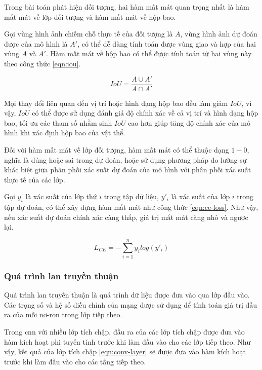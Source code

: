 Trong bài toán phát hiện đối tượng, hai hàm mất mát quan trọng nhất là hàm mất mát về lớp đối tượng và hàm mất mát về hộp bao.

Gọi vùng hình ảnh chiếm chỗ thực tế của đối tượng là $A$, vùng hình ảnh dự đoán được của mô hình là $A'$, có thể dễ dàng tính toán được vùng giao và hợp của hai vùng $A$ và $A'$. Hàm mất mát về hộp bao có thể được tính toán từ hai vùng này theo công thức \ref{eqn:iou}.

\begin{equation} 
	\label{eqn:iou}
	IoU=\frac{A\cup A'}{A\cap A'}
\end{equation}

Mọi thay đổi liên quan đến vị trí hoặc hình dạng hộp bao đều làm giảm $IoU$, vì vậy, $IoU$ có thể được sử dụng đánh giá độ chính xác về cả vị trí và hình dạng hộp bao, tối ưu các tham số nhằm sinh $IoU$ cao hơn giúp tăng độ chính xác của mô hình khi xác định hộp bao của vật thể.

Đối với hàm mất mát về lớp đối tượng, hàm mất mát có thể thuộc dạng $1 - 0$, nghĩa là đúng hoặc sai trong dự đoán, hoặc sử dụng phương pháp đo lường sự khác biệt giữa phân phối xác suất dự đoán của mô hình với phân phối xác suất thực tế của các lớp.

Gọi $y_i$ là xác suất của lớp thứ $i$ trong tập dữ liệu, $y'_i$ là xác suất của lớp $i$ trong tập dự đoán, có thể xây dựng hàm mất mát như công thức \ref{eqn:ce-loss}. Như vậy, nếu xác suất dự đoán chính xác càng thấp, giá trị mất mát càng nhỏ và ngược lại.

\begin{equation}
	\label{eqn:ce-loss}
	L_{CE} = - \sum_{i = 1}^{n}y_ilog(y'_i)
\end{equation}

\subsubsection{Quá trình lan truyền thuận}

Quá trình lan truyền thuận là quá trình dữ liệu được đưa vào qua lớp đầu vào. Các trọng số và hệ số điều chỉnh của mạng được sử dụng để tính toán giá trị đầu ra của mỗi nơ-ron trong lớp tiếp theo.

Trong \acrshort{cnn} với nhiều lớp tích chập, đầu ra của các lớp tích chập được đưa vào hàm kích hoạt phi tuyến tính trước khi làm đầu vào cho các lớp tiếp theo. Như vậy, kết quả của lớp tích chập \ref{eqn:conv-layer} sẽ được đưa vào hàm kích hoạt trước khi làm đầu vào cho các tầng tiếp theo. 

